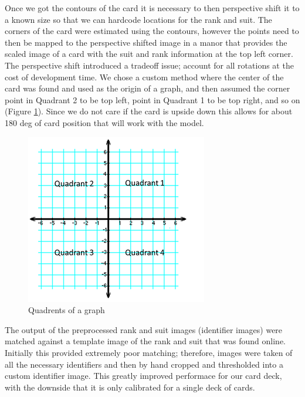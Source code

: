 \documentclass[conference]{IEEEtran}
\begin{document}
Once we got the contours of the card it is necessary to then perspective shift it to a known size so
that we can hardcode locations for the rank and suit. The corners of the card were estimated using
the contours, however the points need to then be mapped to the perspective shifted image in a manor
that provides the scaled image of a card with the suit and rank information at the top left corner.
The perspective shift introduced a tradeoff issue; account for all rotations at the cost of
development time. We chose a custom method where the center of the card was found and used as the
origin of a graph, and then assumed the corner point in Quadrant 2 to be top left, point in Quadrant
1 to be top right, and so on (Figure \ref{fig:graph}). Since we do not care if the card is upside
down this allows for about 180 deg of card position that will work with the model.

\begin{figure}[htbp]
\centerline{\includegraphics{graph-quadrants.png}}
\caption{Quadrents of a graph}
\label{fig:graph}
\end{figure}


The output of the preprocessed rank and suit images (identifier images) were matched against a
template image of the rank and suit that was found online. Initially this provided extremely poor
matching; therefore, images were taken of all the necessary identifiers and then by hand cropped and
thresholded into a custom identifier image. This greatly improved performace for our card deck, with
the downside that it is only calibrated for a single deck of cards.
\end{document}
